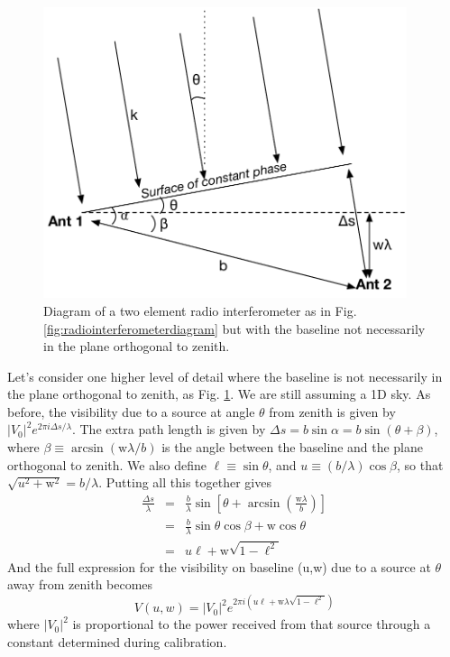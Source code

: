 \begin{figure}[h]
    \centering
    \includegraphics[width=0.95\textwidth]{chap0_intro/radio_interferometer_diagram_with_w.pdf}
    \caption[Diagram of a two element radio interferometer with non-zero $w$.]{Diagram of a two element radio interferometer as in Fig. \ref{fig:radiointerferometerdiagram} but with the baseline not necessarily in the plane orthogonal to zenith.}
    \label{fig:radiointerferometerdiagramwithw}
\end{figure}

Let's consider one higher level of detail where the baseline is not necessarily in the plane orthogonal to zenith, as Fig. \ref{fig:radiointerferometerdiagramwithw}. 
We are still assuming a 1D sky. As before, the visibility due to a source at angle $\theta$ from zenith is given by $|V_0|^2 e^{2\pi i \Delta s/\lambda}$. 
The extra path length is given by $\Delta s=b\sin\alpha=b\sin(\theta+\beta)$, where $\beta\equiv\arcsin (\text{w}\lambda/b)$ is the angle between the baseline and the plane orthogonal to zenith. 
We also define $\ell\equiv\sin\theta$, and
 $u\equiv (b/\lambda)\cos\beta$, 
 so that $\sqrt{u^2+\text{w}^2}=b/\lambda$. 
 Putting all this together gives
\begin{eqnarray}
	\frac{\Delta s}{\lambda} &=& \frac{b}{\lambda}\sin\left[\theta+\arcsin\left(\frac{\text{w}\lambda}{b}\right)\right]\\
	 &=& \frac{b}{\lambda}\sin\theta\cos\beta+\text{w}\cos\theta\\
	 &=& u\ell+\text{w}\sqrt{1-\ell^2}
\end{eqnarray}
And the full expression for the visibility on baseline (u,w) due to a source at $\theta$ away from zenith becomes 
\begin{equation}
	V(u,w)=|V_0|^2 e^{2\pi i (u\ell+\text{w}\lambda\sqrt{1-\ell^2})}
\end{equation}
where $|V_0|^2$ is proportional to the power received from that source through a constant determined during calibration. 

